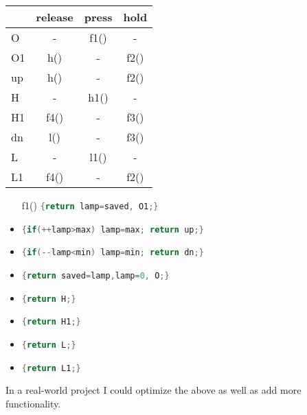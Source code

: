 \documentclass[a4paper, 11pt, fleqn, twoside]{scrartcl}%
\begin{document}
\begin{minipage}{0.35\textwidth}
\hspace{2em}\begin{tabular}{|l|c|c|c|}\hline
   & release  & press   & hold \\ \hline%
 O & -    & f1() &-     \\ %
 O1& h()  & -    & f2() \\ %
 up& h()  & -    & f2() \\ \hline
 H & -    & h1() & -    \\ %
 H1& f4() & -    & f3() \\ %
 dn& l()  & -    & f3() \\ \hline
 L & -    & l1() & -    \\ %
 L1& f4() & -    & f2() \\ \hline
\end{tabular}
\end{minipage}
\begin{minipage}{0.6\textwidth}\begin{itemize}
\item[f1()] \lstinline[language=C]${return lamp=saved, O1;}$
\item[f2()] \lstinline[language=C]${if(++lamp>max) lamp=max; return up;}$
\item[f3()] \lstinline[language=C]${if(--lamp<min) lamp=min; return dn;}$
\item[f4()] \lstinline[language=C]${return saved=lamp,lamp=0, O;}$
\item[h()]  \lstinline[language=C]${return H;}$
\item[h1()] \lstinline[language=C]${return H1;}$
\item[l()]  \lstinline[language=C]${return L;}$
\item[l1()] \lstinline[language=C]${return L1;}$
\end{itemize}
\end{minipage}

\vspace{2ex}
In a real-world project I could optimize the above as well as add more functionality.

\end{document}
